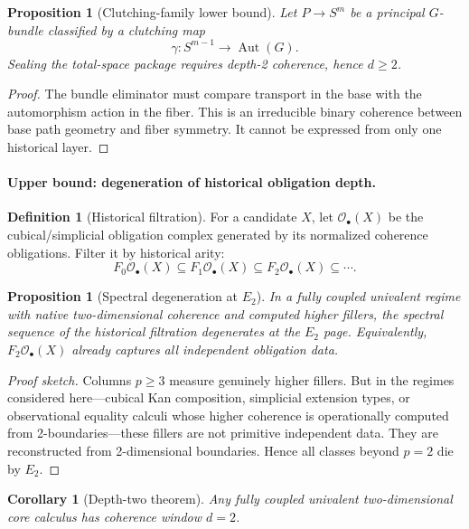 \documentclass{lmcs}
\theoremstyle{plain}
\newtheorem{prop}[thm]{Proposition}
\newtheorem{cor}[thm]{Corollary}
\theoremstyle{definition}
\newtheorem{defi}[thm]{Definition}
\theoremstyle{remark}
\newcommand{\Ob}{\ensuremath{\mathcal{O}}}
\newcommand{\Aut}{\ensuremath{\operatorname{Aut}}}
\begin{document}
\begin{prop}[Clutching-family lower bound]
\label{prop:clutching}
Let $P\to S^m$ be a principal $G$-bundle classified by a clutching map
\[
  \gamma:S^{m-1}\to \Aut(G).
\]
Sealing the total-space package requires depth-2 coherence, hence $d\geq 2$.
\end{prop}

\begin{proof}
The bundle eliminator must compare transport in the base with the automorphism action in the fiber.
This is an irreducible binary coherence between base path geometry and fiber symmetry.
It cannot be expressed from only one historical layer.
\end{proof}

\paragraph{Upper bound: degeneration of historical obligation depth.}

\begin{defi}[Historical filtration]
For a candidate $X$, let $\Ob_\bullet(X)$ be the cubical/simplicial obligation complex generated by its normalized coherence obligations.
Filter it by historical arity:
\[
  F_0\Ob_\bullet(X)\subseteq F_1\Ob_\bullet(X)\subseteq F_2\Ob_\bullet(X)\subseteq\cdots .
\]
\end{defi}

\begin{prop}[Spectral degeneration at $E_2$]
\label{prop:spectral}
In a fully coupled univalent regime with native two-dimensional coherence and computed higher fillers, the spectral sequence of the historical filtration degenerates at the $E_2$ page.
Equivalently, $F_2\Ob_\bullet(X)$ already captures all independent obligation data.
\end{prop}

\begin{proof}[Proof sketch]
Columns $p\geq 3$ measure genuinely higher fillers.
But in the regimes considered here---cubical Kan composition, simplicial extension types, or observational equality calculi whose higher coherence is operationally computed from 2-boundaries---these fillers are not primitive independent data.
They are reconstructed from 2-dimensional boundaries.
Hence all classes beyond $p=2$ die by $E_2$.
\end{proof}

\begin{cor}[Depth-two theorem]
\label{cor:depth-two}
Any fully coupled univalent two-dimensional core calculus has coherence window $d=2$.
\end{cor}
\end{document}
